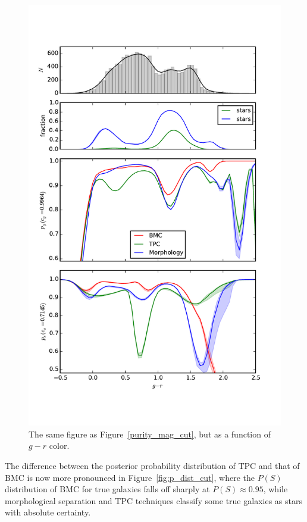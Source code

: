 \documentclass[useAMS,usenatbib]{mn2e}
\begin{document}
\begin{figure}
  \centering
  \includegraphics[width=\linewidth]{figures/purity_g_r_cut.pdf}
  \caption{The same figure as Figure~\ref{purity_mag_cut},
           but as a function of $g-r$ color.}
  \label{fig:purity_g-r_cut}
\end{figure}


The difference between the posterior probability distribution of
TPC and that of BMC is now more pronounced in Figure~\ref{fig:p_dist_cut},
where the $P\left(S\right)$ distribution of BMC for true galaxies
falls off sharply at $P\left(S\right)\approx0.95$,
while morphological separation and TPC techniques
classify some true galaxies as stars with absolute certainty.
\end{document}
